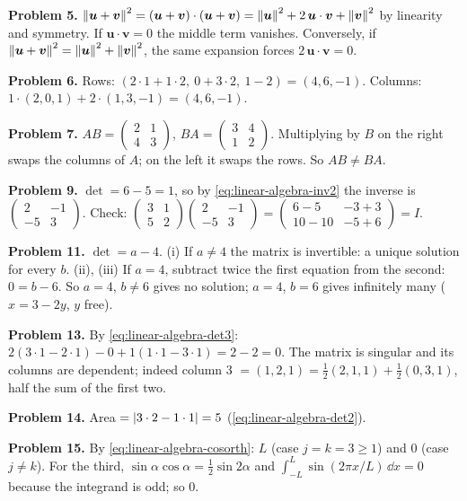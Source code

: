\textbf{Problem 5.} $\left\lVert \bm u+\bm v\right\rVert^2=(\bm u+\bm v)\cdot(\bm u+\bm v)=\left\lVert \bm u\right\rVert^2+2\,\bm u\cdot\bm v+\left\lVert \bm v\right\rVert^2$ by linearity and symmetry. If $\bm u\cdot\bm v=0$ the middle term vanishes. Conversely, if $\left\lVert \bm u+\bm v\right\rVert^2=\left\lVert \bm u\right\rVert^2+\left\lVert \bm v\right\rVert^2$, the same expansion forces $2\,\bm u\cdot\bm v=0$.

\textbf{Problem 6.} Rows: $(2\cdot1+1\cdot2,\ 0+3\cdot2,\ 1-2)=(4,6,-1)$. Columns: $1\cdot(2,0,1)+2\cdot(1,3,-1)=(4,6,-1)$.

\textbf{Problem 7.} $AB=\begin{pmatrix}2&1\\4&3\end{pmatrix}$, $BA=\begin{pmatrix}3&4\\1&2\end{pmatrix}$. Multiplying by $B$ on the right swaps the columns of $A$; on the left it swaps the rows. So $AB\ne BA$.

\textbf{Problem 9.} $\det=6-5=1$, so by \cref{eq:linear-algebra-inv2} the inverse is $\begin{pmatrix}2&-1\\-5&3\end{pmatrix}$. Check: $\begin{pmatrix}3&1\\5&2\end{pmatrix}\begin{pmatrix}2&-1\\-5&3\end{pmatrix}=\begin{pmatrix}6-5&-3+3\\10-10&-5+6\end{pmatrix}=I$.

\textbf{Problem 11.} $\det=a-4$. (i) If $a\ne4$ the matrix is invertible: a unique solution for every $b$. (ii), (iii) If $a=4$, subtract twice the first equation from the second: $0=b-6$. So $a=4$, $b\ne6$ gives no solution; $a=4$, $b=6$ gives infinitely many ($x=3-2y$, $y$ free).

\textbf{Problem 13.} By \cref{eq:linear-algebra-det3}: $2(3\cdot1-2\cdot1)-0+1(1\cdot1-3\cdot1)=2-2=0$. The matrix is singular and its columns are dependent; indeed column 3 $=(1,2,1)=\tfrac12(2,1,1)+\tfrac12(0,3,1)$, half the sum of the first two.

\textbf{Problem 14.} Area $=\left\lvert 3\cdot2-1\cdot1\right\rvert=5$ (\cref{eq:linear-algebra-det2}).

\textbf{Problem 15.} By \cref{eq:linear-algebra-cosorth}: $L$ (case $j=k=3\ge1$) and $0$ (case $j\ne k$). For the third, $\sin\alpha\cos\alpha=\tfrac12\sin2\alpha$ and $\int_{-L}^{L}\sin(2\pi x/L)\,\dd x=0$ because the integrand is odd; so $0$.


